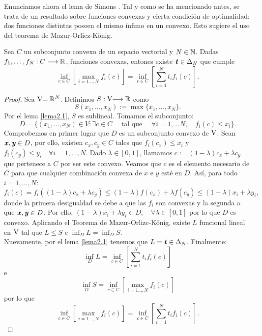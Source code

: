 Enunciamos ahora el lema de Simons \cite{Simons2008}. Tal y como se ha mencionado antes, se trata de un resultado sobre funciones convexas y cierta condición de optimalidad: dos funciones distintas poseen el mismo ínfimo en un convexo. Esto sugiere el uso del teorema de Mazur-Orlicz-König.
\bigskip
\begin{lemaBox}[Simons]\label{Simons}
	Sea $ C $ un subconjunto convexo de un espacio vectorial y $ N \in \mathbb{N} $. Dadas $  $ $ f_1, \dots, f_N : C \longrightarrow \mathbb{R} $, funciones convexas, entones existe $ \textbf{\emph{t}} \in \Delta_N $ que cumple
	\[
	\inf_{c \in C}\left[ \max_{i=1\dots,N } f_i(c)\right] = \inf_{c \in C} \left[ \sum_{i=1}^{N} t_i f_i(c) \right].
	\] 
\end{lemaBox}
\begin{proof}
	Sea  $ \vecSpace = \RR^N $. Definimos $S:\hspace{1mm}\vecSpace \longrightarrow \RR $ como \[ S(x_1, ..., x_N) := \max \{x_1, ..., x_N\}. \] Por el lema \ref{lema2.1}, $ S $ es sublineal. Tomamos el subconjunto:
	\[ 
	D = \{ (x_1, ..., x_N)\in V: \exists c \in C \quad \text{ tal que } \quad \forall i = 1,...N,\quad f_i(c) \leq x_i \}.
	\]
	Comprobemos en primer lugar que $ D $ es un subconjunto convexo de $ \vecSpace $. Sean $ \textbf{\emph{x}}, \textbf{\emph{y}} \in D $, por ello, existen $ c_x, c_y \in C $ tales que $ f_i (c_x) \leq x_i  $ y $ f_i (c_y) \leq y_i \quad \forall i=1,...,N $. Dado $ \lambda \in [0,1] $, llamamos $ c := (1-\lambda)c_x + \lambda c_y $ que pertenece a $ C $ por ser este convexo. Veamos que $ c $ es el elemento necesario de $ C $ para que cualquier combinación convexa de $ x $ e $ y $ esté en $ D $. Así, para todo $ i =1,...,N  $:	
	\[
	f_i(c) = f_i((1-\lambda)c_x + \lambda c_y) \leq (1-\lambda)f(c_x) + \lambda f(c_y) \leq (1-\lambda)x_i + \lambda y_i ,
	\]
	donde la primera desigualdad se debe a que las $ f_i $ son convexas y la segunda a que $ \textbf{\emph{x}},\textbf{\emph{y}} \in D $. Por ello, $ (1-\lambda)x_i + \lambda y_i \in D , \quad \forall \lambda \in [0,1] $ por lo que $ D $ es convexo. Aplicando el Teorema de Mazur-Orlizc-König, existe $ L $ funcional lineal en $ \vecSpace $ tal que $ L \leq S $ e $ \inf_D L = \inf_D S $. \\
	
	Nuevamente, por el lema \ref{lema2.1} tenemos que $ L = \textbf{\emph{t}} \in \Delta_N$. Finalmente:
	\[
	\inf_D L =\inf_{c \in C} \left[ \sum_{i=1}^{N} t_i f_i(c) \right]
	\]
	e
	\[
	\inf_D S = \inf_{c \in C}\left[ \max_{i=1\dots,N } f_i(c)\right]
	\]
	por lo que 
	\[ \inf_{c \in C}\left[ \max_{i=1\dots,N } f_i(c)\right] = \inf_{c \in C} \left[ \sum_{i=1}^{N} t_i f_i(c) \right]. \] 
\end{proof}
